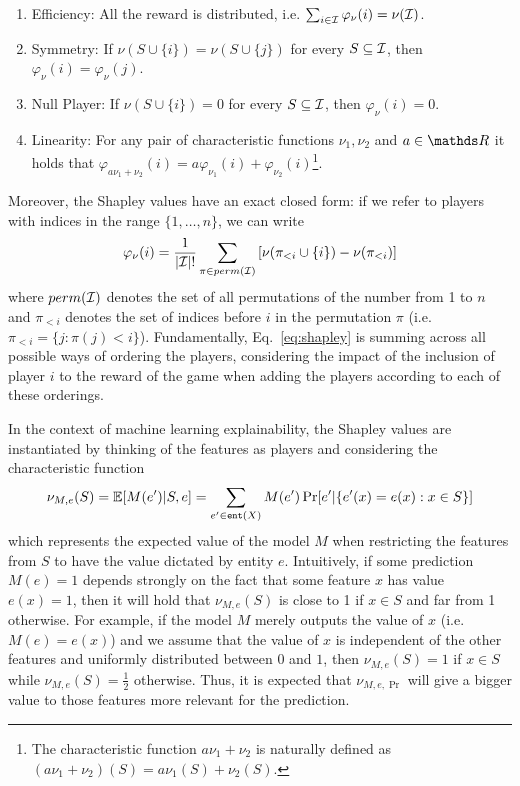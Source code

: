 \begin{enumerate}
	\item Efficiency: All the reward is distributed, i.e. $\sum_{i \in \mathcal{I}} \varphi_{\nu}(i) = \nu(\mathcal{I})$.
	\item Symmetry: If $\nu(S \cup \{i\}) = \nu(S \cup \{j\})$ for every $S \subseteq \mathcal{I}$, then $\varphi_{\nu}(i) = \varphi_{\nu}(j)$.
	\item Null Player: If $\nu(S \cup \{i\}) = 0$ for every $S \subseteq \mathcal{I}$, then $\varphi_{\nu}(i) = 0$.
	\item Linearity: For any pair of characteristic functions $\nu_1,\nu_2$ and $a \in \R$ it holds that $\varphi_{a\nu_1 + \nu_2}(i) = a\varphi_{\nu_1}(i) + \varphi_{\nu_2}(i)$\footnote{The characteristic function $a \nu_1 + \nu_2$ is naturally defined as $(a \nu_1 + \nu_2)(S) = a \nu_1(S) + \nu_2(S)$.}. 
\end{enumerate}

Moreover, the Shapley values have an exact closed form: if we refer to players with indices in the range $\{1,\ldots, n\}$, we can write
%
\begin{align}\label{eq:shapley}
	\varphi_{\nu}(i) =  \frac{1}{|\mathcal{I}|!} \sum_{\pi \in perm(\mathcal{I})} \left[ \nu(\pi_{<i} \cup \{i\}) - \nu(\pi_{<i}) \right]
\end{align}
%
where $perm(\mathcal{I})$ denotes the set of all permutations of the number from 1 to $n$ and $\pi_{<i}$ denotes the set of indices before $i$ in the permutation $\pi$ (i.e. $\pi_{<i} = \{j : \pi(j) < i\}$). Fundamentally, Eq.~\eqref{eq:shapley} is summing across all possible ways
of ordering the players, considering the impact of the inclusion of player $i$ to the reward of the game when adding the players according to each of these orderings.

In the context of machine learning explainability, the Shapley values are instantiated by thinking of the features as players and considering the characteristic function
%
\begin{align}\label{eq:char_fun_for_ML}
	\nu_{M,e}(S) = \mathbb{E}[M(e') | S, e] = \sum_{e'\in \texttt{ent}(X)} M(e') \Pr[e'| \{e'(x) = e(x) : x \in S\}] 
\end{align}
%
which represents the expected value of the model $M$ when restricting the features from $S$ to have the value dictated by entity $e$.
Intuitively, if some prediction $M(e) = 1$ depends strongly on the fact that some feature $x$ has value $e(x) = 1$, then it will hold that $\nu_{M,e}(S)$ is close to 1 if $x \in S$ and far from 1 otherwise. For example, if the model $M$ merely outputs the value of $x$ (i.e. $M(e) = e(x)$) and 
we assume that the value of $x$ is independent of the other features and uniformly distributed between $0$ and $1$, then $\nu_{M,e}(S) = 1$ if $x\in S$ while $\nu_{M,e}(S) = \frac{1}{2}$ otherwise. Thus, it is expected that $\nu_{M,e,\Pr}$ will give a bigger value to those features more relevant for the prediction.

